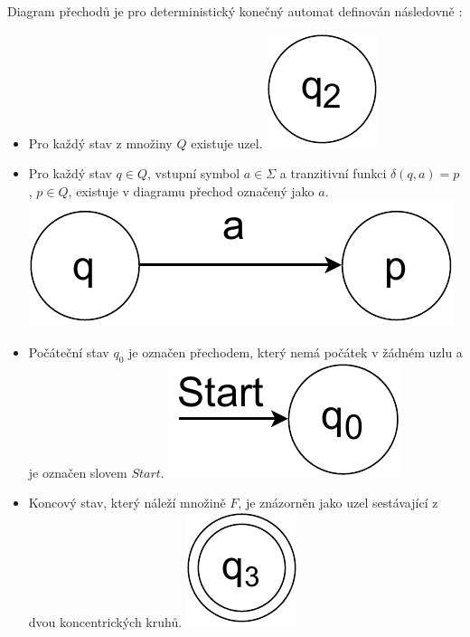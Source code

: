 \begin{definition}
Diagram přechodů je pro deterministický konečný automat definován následovně \cite{HopcroftJohnE.2007Itat}:
\begin{itemize}
    \item Pro každý stav z množiny $Q$ existuje uzel. \includegraphics[scale=0.3]{obrazky-figures/Stav.pdf}
    \item Pro každý stav $q \in Q$, vstupní symbol $a\in \Sigma$ a tranzitivní funkci $\delta(q, a) = p$, $p \in Q$, existuje v diagramu přechod označený jako $a$. \includegraphics[scale=0.3]{obrazky-figures/Prechod.pdf}
    \item Počáteční stav $q_{0}$ je označen přechodem, který nemá počátek v žádném uzlu a je označen slovem $Start$. \includegraphics[scale=0.3]{obrazky-figures/StartStav.pdf}
    \item Koncový stav, který náleží množině $F$, je znázorněn jako uzel sestávající z dvou koncentrických kruhů.  \includegraphics[scale=0.3]{obrazky-figures/FinalStav.pdf}
\end{itemize}
\end{definition}


